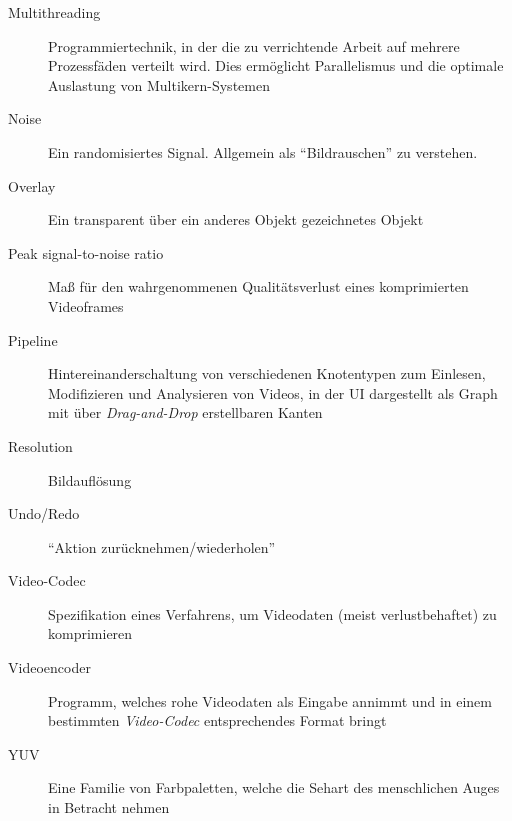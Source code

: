 \begin{description}
    \item[Multithreading] Programmiertechnik, in der die zu verrichtende Arbeit auf mehrere Prozessfäden verteilt wird. Dies ermöglicht Parallelismus und die optimale Auslastung von Multikern-Systemen
    \item[Noise] Ein randomisiertes Signal. Allgemein als ``Bildrauschen'' zu verstehen.
    \item[Overlay] Ein transparent über ein anderes Objekt gezeichnetes Objekt
    \item[Peak signal-to-noise ratio] Maß für den wahrgenommenen Qualitätsverlust eines komprimierten Videoframes
    \item[Pipeline] Hintereinanderschaltung von verschiedenen Knotentypen zum Einlesen, Modifizieren und Analysieren von Videos, in der UI dargestellt als Graph mit über \emph{Drag-and-Drop} erstellbaren Kanten
    \item[Resolution] Bildauflösung
    \item[Undo/Redo] ``Aktion zurücknehmen/wiederholen''
    \item[Video-Codec] Spezifikation eines Verfahrens, um Videodaten (meist verlustbehaftet) zu komprimieren
    \item[Videoencoder] Programm, welches rohe Videodaten als Eingabe annimmt und in einem bestimmten \emph{Video-Codec} entsprechendes Format bringt
    \item[YUV] Eine Familie von Farbpaletten, welche die Sehart des menschlichen Auges in Betracht nehmen
\end{description}
